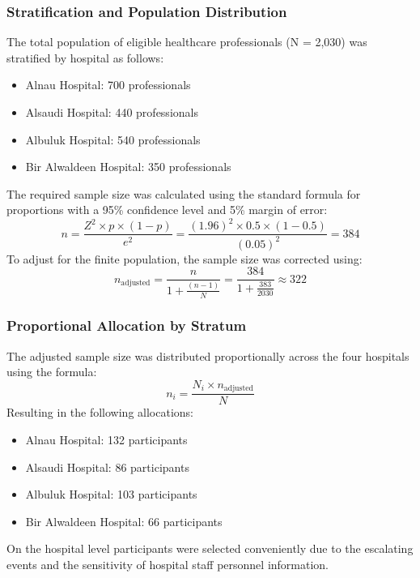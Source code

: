 \documentclass[12pt]{article}
\begin{document}
\subsubsection{Stratification and Population Distribution}
The total population of eligible healthcare professionals (N = 2,030) was stratified by hospital as follows:
\begin{itemize}[noitemsep]
\item Alnau Hospital: 700 professionals
\item Alsaudi Hospital: 440 professionals
\item Albuluk Hospital: 540 professionals
\item Bir Alwaldeen Hospital: 350 professionals
\end{itemize}

The required sample size was calculated using the standard formula for proportions with a 95\% confidence level and 5\% margin of error:
\[
n = \frac{Z^2 \times p \times (1-p)}{e^2} = \frac{(1.96)^2 \times 0.5 \times (1-0.5)}{(0.05)^2} = 384
\]
To adjust for the finite population, the sample size was corrected using:
\[
n_{\text{adjusted}} = \frac{n}{1 + \frac{(n - 1)}{N}} = \frac{384}{1 + \frac{383}{2030}} \approx 322
\]

\subsubsection{Proportional Allocation by Stratum}
The adjusted sample size was distributed proportionally across the four hospitals using the formula:
\[
n_i = \frac{N_i \times n_{\text{adjusted}}}{N}
\]
Resulting in the following allocations:
\begin{itemize}[noitemsep]
\item Alnau Hospital: 132 participants
\item Alsaudi Hospital: 86 participants
\item Albuluk Hospital: 103 participants
\item Bir Alwaldeen Hospital: 66 participants
\end{itemize}
On the hospital level participants were selected conveniently due to the escalating events and the sensitivity of hospital staff personnel information.
\end{document}
